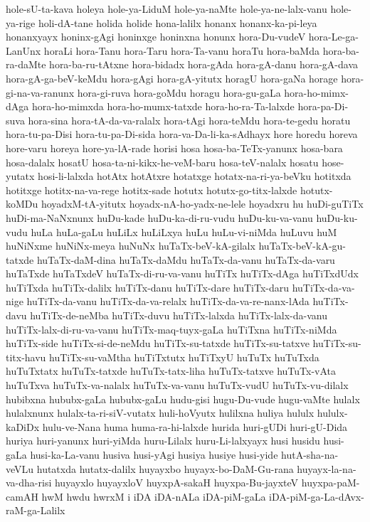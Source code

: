 {hole-sU-ta-kava
holeya
hole-ya-LiduM
hole-ya-naMte
hole-ya-ne-lalx-vanu
hole-ya-rige
holi-dA-tane
holida
holide
hona-lalilx
honanx
honanx-ka-pi-leya
honanxyayx
honinx-gAgi
honinxge
honinxna
honunx
hora-Du-vudeV
hora-Le-ga-LanUnx
horaLi
hora-Tanu
hora-Taru
hora-Ta-vanu
horaTu
hora-baMda
hora-ba-ra-daMte
hora-ba-ru-tAtxne
hora-bidadx
hora-gAda
hora-gA-danu
hora-gA-dava
hora-gA-ga-beV-keMdu
hora-gAgi
hora-gA-yitutx
horagU
hora-gaNa
horage
hora-gi-na-va-ranunx
hora-gi-ruva
hora-goMdu
horagu
hora-gu-gaLa
hora-ho-mimx-dAga
hora-ho-mimxda
hora-ho-mumx-tatxde
hora-ho-ra-Ta-lalxde
hora-pa-Di-suva
hora-sina
hora-tA-da-va-ralalx
hora-tAgi
hora-teMdu
hora-te-gedu
horatu
hora-tu-pa-Disi
hora-tu-pa-Di-sida
hora-va-Da-li-ka-sAdhayx
hore
horedu
horeva
hore-varu
horeya
hore-ya-lA-rade
horisi
hosa
hosa-ba-TeTx-yanunx
hosa-bara
hosa-dalalx
hosatU
hosa-ta-ni-kikx-he-veM-baru
hosa-teV-nalalx
hosatu
hose-yutatx
hosi-li-lalxda
hotAtx
hotAtxre
hotatxge
hotatx-na-ri-ya-beVku
hotitxda
hotitxge
hotitx-na-va-rege
hotitx-sade
hotutx
hotutx-go-titx-lalxde
hotutx-koMDu
hoyadxM-tA-yitutx
hoyadx-nA-ho-yadx-ne-lele
hoyadxru
hu
huDi-guTiTx
huDi-ma-NaNxnunx
huDu-kade
huDu-ka-di-ru-vudu
huDu-ku-va-vanu
huDu-ku-vudu
huLa
huLa-gaLu
huLiLx
huLiLxya
huLu
huLu-vi-niMda
huLuvu
huM
huNiNxme
huNiNx-meya
huNuNx
huTaTx-beV-kA-gilalx
huTaTx-beV-kA-gu-tatxde
huTaTx-daM-dina
huTaTx-daMdu
huTaTx-da-vanu
huTaTx-da-varu
huTaTxde
huTaTxdeV
huTaTx-di-ru-va-vanu
huTiTx
huTiTx-dAga
huTiTxdUdx
huTiTxda
huTiTx-dalilx
huTiTx-danu
huTiTx-dare
huTiTx-daru
huTiTx-da-va-nige
huTiTx-da-vanu
huTiTx-da-va-relalx
huTiTx-da-va-re-nanx-lAda
huTiTx-davu
huTiTx-de-neMba
huTiTx-duvu
huTiTx-lalxda
huTiTx-lalx-da-vanu
huTiTx-lalx-di-ru-va-vanu
huTiTx-maq-tuyx-gaLa
huTiTxna
huTiTx-niMda
huTiTx-side
huTiTx-si-de-neMdu
huTiTx-su-tatxde
huTiTx-su-tatxve
huTiTx-su-titx-havu
huTiTx-su-vaMtha
huTiTxtutx
huTiTxyU
huTuTx
huTuTxda
huTuTxtatx
huTuTx-tatxde
huTuTx-tatx-liha
huTuTx-tatxve
huTuTx-vAta
huTuTxva
huTuTx-va-nalalx
huTuTx-va-vanu
huTuTx-vudU
huTuTx-vu-dilalx
hubibxna
hububx-gaLa
hububx-gaLu
hudu-gisi
hugu-Du-vude
hugu-vaMte
hulalx
hulalxnunx
hulalx-ta-ri-siV-vutatx
huli-hoVyutx
hulilxna
huliya
hululx
hululx-kaDiDx
hulu-ve-Nana
huma
huma-ra-hi-lalxde
hurida
huri-gUDi
huri-gU-Dida
huriya
huri-yanunx
huri-yiMda
huru-Lilalx
huru-Li-lalxyayx
husi
husidu
husi-gaLa
husi-ka-La-vanu
husiva
husi-yAgi
husiya
husiye
husi-yide
hutA-sha-na-veVLu
hutatxda
hutatx-dalilx
huyayxbo
huyayx-bo-DaM-Gu-rana
huyayx-la-na-va-dha-risi
huyayxlo
huyayxloV
huyxpA-sakaH
huyxpa-Bu-jayxteV
huyxpa-paM-camAH
hwM
hwdu
hwrxM
i
iDA
iDA-nALa
iDA-piM-gaLa
iDA-piM-ga-La-dAvx-raM-ga-Lalilx
}
